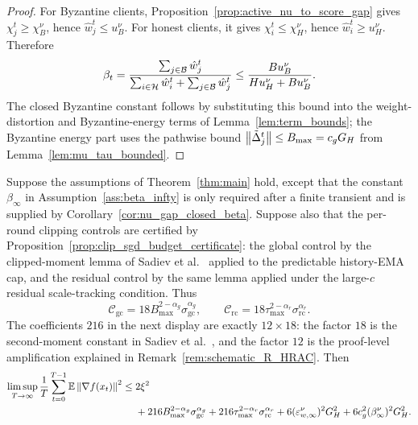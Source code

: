 \begin{proof}
For Byzantine clients, Proposition~\ref{prop:active_nu_to_score_gap} gives
\(\chi_j^t\ge \chi_B^\nu\), hence
\(\hat w_j^t\le u_B^\nu\). For honest clients, it gives
\(\chi_i^t\le \chi_H^\nu\), hence
\(\hat w_i^t\ge u_H^\nu\). Therefore
\[
    \beta_t
    =
    \frac{\sum_{j\in\mathcal{B}}\hat w_j^t}
         {\sum_{i\in\mathcal{H}}\hat w_i^t+\sum_{j\in\mathcal{B}}\hat w_j^t}
    \le
    \frac{B u_B^\nu}{H u_H^\nu+B u_B^\nu}.
\]
The closed Byzantine constant follows by substituting this bound into the
weight-distortion and Byzantine-energy terms of
Lemma~\ref{lem:term_bounds}; the Byzantine energy part uses the pathwise bound
\(\left\lVert \tilde\Delta_j^t \right\rVert\le B_{\max}=c_gG_H\) from
Lemma~\ref{lem:mu_tau_bounded}.
\end{proof}

\begin{corollary}
\label{cor:sadiev_nu_closed_interval}
Suppose the assumptions of Theorem~\ref{thm:main} hold, except that the
constant \(\beta_\infty\) in Assumption~\ref{ass:beta_infty} is only required
after a finite transient and is supplied by
Corollary~\ref{cor:nu_gap_closed_beta}. Suppose also that the per-round clipping
controls are certified by Proposition~\ref{prop:clip_sgd_budget_certificate}:
the global control by the clipped-moment lemma of
Sadiev et al.~\cite[Lemma~5.1]{sadiev2023highprob} applied to the predictable
history-EMA cap, and the residual control by the same lemma applied
under the large-\(c\) residual scale-tracking condition. Thus
\[
    \mathcal C_{\mathrm{gc}}
    =
    18B_{\max}^{2-\alpha_g}\sigma_{\mathrm{gc}}^{\alpha_g},
    \qquad
    \mathcal C_{\mathrm{rc}}
    =
    18\tau_{\max}^{2-\alpha_r}\sigma_{\mathrm{rc}}^{\alpha_r}.
\]
The coefficients \(216\) in the next display are exactly
\(12\times18\): the factor \(18\) is the second-moment constant in
Sadiev et al.~\cite[Lemma~5.1]{sadiev2023highprob}, and the factor \(12\)
is the proof-level amplification explained in
Remark~\ref{rem:schematic_R_HRAC}.
Then
\begin{align}
    \limsup_{T\to\infty}
    \frac{1}{T}\sum_{t=0}^{T-1}\mathbb{E}\left\lVert \nabla f(x_t) \right\rVert^2
    \le\;&
    2\xi^2
    \nonumber\\
    &+
    216B_{\max}^{2-\alpha_g}\sigma_{\mathrm{gc}}^{\alpha_g}
    +
    216\tau_{\max}^{2-\alpha_r}\sigma_{\mathrm{rc}}^{\alpha_r}
    +
    6(\varepsilon_{w,\infty}^\nu)^2G_H^2
    +
    6c_g^2(\beta_\infty^\nu)^2G_H^2.
    \label{eq:sadiev_nu_closed_interval}
\end{align}
\end{corollary}

